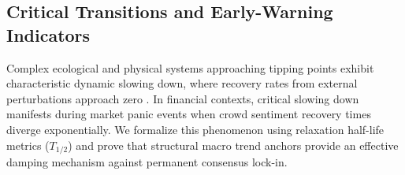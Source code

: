 \subsection{Critical Transitions and Early-Warning Indicators}
Complex ecological and physical systems approaching tipping points exhibit characteristic dynamic slowing down, where recovery rates from external perturbations approach zero \cite{scheffer2009early}. In financial contexts, critical slowing down manifests during market panic events when crowd sentiment recovery times diverge exponentially. We formalize this phenomenon using relaxation half-life metrics ($T_{1/2}$) and prove that structural macro trend anchors provide an effective damping mechanism against permanent consensus lock-in.
